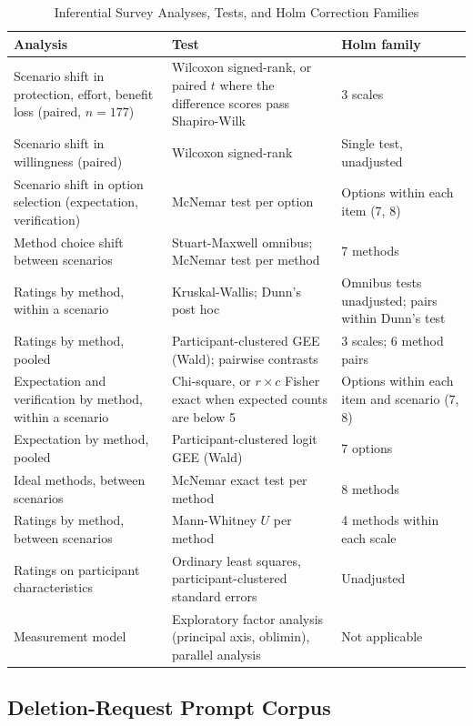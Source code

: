 \documentclass[conference,compsoc]{IEEEtran}
\begin{document}
\begin{table}[t]
\centering
\caption{Inferential Survey Analyses, Tests, and Holm Correction Families}
\label{tab:analysis-families}
\small
\begin{tabular}{@{}p{}p{}p{}@{}}
\toprule
Analysis & Test & Holm family \\
\midrule
Scenario shift in protection, effort, benefit loss (paired, $n=177$)
  & Wilcoxon signed-rank, or paired $t$ where the difference scores pass Shapiro-Wilk
  & 3 scales \\
Scenario shift in willingness (paired)
  & Wilcoxon signed-rank
  & Single test, unadjusted \\
Scenario shift in option selection (expectation, verification)
  & McNemar test per option
  & Options within each item (7, 8) \\
Method choice shift between scenarios
  & Stuart-Maxwell omnibus; McNemar test per method
  & 7 methods \\
Ratings by method, within a scenario
  & Kruskal-Wallis; Dunn's post hoc
  & Omnibus tests unadjusted; pairs within Dunn's test \\
Ratings by method, pooled
  & Participant-clustered GEE (Wald); pairwise contrasts
  & 3 scales; 6 method pairs \\
Expectation and verification by method, within a scenario
  & Chi-square, or $r\times c$ Fisher exact when expected counts are below 5
  & Options within each item and scenario (7, 8) \\
Expectation by method, pooled
  & Participant-clustered logit GEE (Wald)
  & 7 options \\
Ideal methods, between scenarios
  & McNemar exact test per method
  & 8 methods \\
Ratings by method, between scenarios
  & Mann-Whitney $U$ per method
  & 4 methods within each scale \\
Ratings on participant characteristics
  & Ordinary least squares, participant-clustered standard errors
  & Unadjusted \\
Measurement model
  & Exploratory factor analysis (principal axis, oblimin), parallel analysis
  & Not applicable \\
\bottomrule
\end{tabular}
\end{table}

\subsection{Deletion-Request Prompt Corpus}
\label{sec:prompt-corpus}
\end{document}
